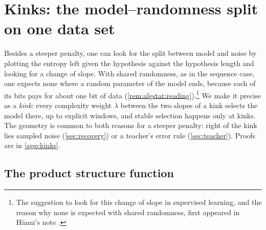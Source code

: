 \section{Kinks: the model--randomness split on one data set}\label{sec:kinks}

Besides a steeper penalty, one can look for the split between model and noise by plotting the entropy left given the hypothesis against the hypothesis length and looking for a change of slope. With shared randomness, as in the sequence case, one expects none where a random parameter of the model ends, because each of its bits pays for about one bit of data (\cref{rem:algstat:reading}).\footnote{The suggestion to look for this change of slope in supervised learning, and the reason why none is expected with shared randomness, first appeared in H\"anni's note \citep{hanni2026grokking}.} We make it precise as a \emph{kink}: every complexity weight $\lambda$ between the two slopes of a kink selects the model there, up to explicit windows, and stable selection happens only at kinks. The geometry is common to both reasons for a steeper penalty: right of the kink lies sampled noise (\cref{sec:recovery}) or a teacher's error rule (\cref{sec:teacher}). Proofs are in \cref{app:kinks}.

\subsection{The product structure function}\label{sec:kinks:structure}\label{sec:algstat:product}

